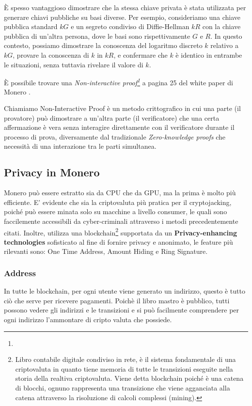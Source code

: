\documentclass[12pt,a4paper]{article}
\begin{document}
È spesso vantaggioso dimostrare che la stessa chiave privata è stata utilizzata
per generare chiavi pubbliche su basi diverse. Per esempio, consideriamo una
chiave pubblica standard $kG$ e un segreto condiviso di Diffie-Hellman $kR$ con
la chiave pubblica di un'altra persona, dove le basi sono rispettivamente $G$ e
$R$. In questo contesto, possiamo dimostrare la conoscenza del logaritmo
discreto $k$ relativo a $kG$, provare la conoscenza di $k$ in $kR$, e confermare
che $k$ è identico in entrambe le situazioni, senza tuttavia rivelare il valore
di $k$.

È possibile trovare una \textit{Non-interactive proof\footnote{}} a pagina 25
del white paper di Monero \cite{Zero To Monero}.

Chiamiamo Non-Interactive Proof è un metodo crittografico in cui una parte (il
provatore) può dimostrare a un'altra parte (il verificatore) che una certa
affermazione è vera senza interagire direttamente con il verificatore durante il
processo di prova, diversamente dal tradizionale \textit{Zero-knowledge proofs}
che necessità di una interazione tra le parti simultanea.

\subsection{Privacy in Monero}
Monero può essere estratto sia da CPU che da GPU, ma la prima è molto più
efficiente. E' evidente che sia la criptovaluta più pratica per il
cryptojacking, poiché può essere minata solo su macchine a livello consumer, le
quali sono faccilemente accessibili da cyber-criminali attraverso i metodi
precedentemente citati. Inoltre, utilizza una blockchain\footnote{Libro
contabile digitale condiviso in rete, è il sistema fondamentale di una
criptovaluta in quanto tiene memoria di tutte le transizioni eseguite nella
storia della realtiva criptovaluta. Viene detta blockchain poiché è una catena
di blocchi, ognuno rappresenta una transizione che viene agganciata alla catena
attraverso la risoluzione di calcoli complessi (mining).} supportata da un
\textbf{Privacy-enhancing technologies} sofisticato al fine di fornire privacy e
anonimato, le feature più rilevanti sono: One Time Address, Amount Hiding e Ring Signature.

\subsubsection{Address}
In tutte le blockchain, per ogni utente viene generato un indirizzo, questo è
tutto ciò che serve per ricevere pagamenti. Poichè il libro mastro è pubblico,
tutti possono vedere gli indirizzi e le transizioni e si può facilmente
comprendere per ogni indirizzo l'ammontare di cripto valuta che possiede.
\end{document}
